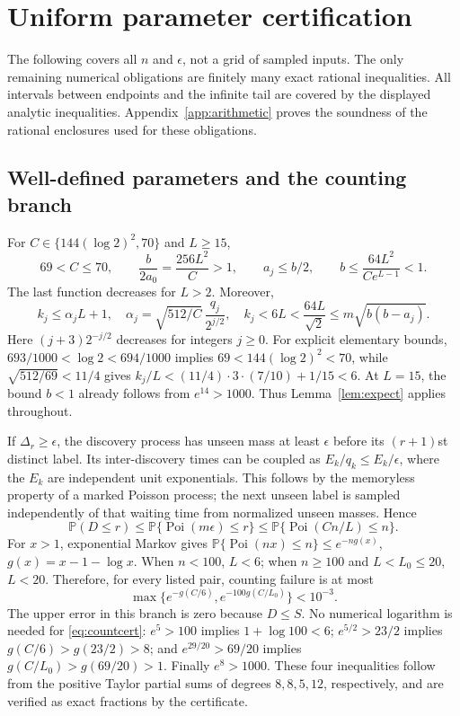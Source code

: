 \documentclass[10pt]{article}
\newcommand{\Prb}{\mathbb P}
\newcommand{\Poi}{\operatorname{Poi}}
\begin{document}
\section{Uniform parameter certification}
The following covers all $n$ and $\epsilon$, not a grid of sampled inputs.
The only remaining numerical obligations are finitely many exact rational
inequalities. All intervals between endpoints and the infinite tail are
covered by the displayed analytic inequalities. Appendix~\ref{app:arithmetic}
proves the soundness of the rational enclosures used for these obligations.

\subsection{Well-defined parameters and the counting branch}
For $C\in\{144(\log2)^2,70\}$ and $L\ge15$,
\[
 69<C\le70,\qquad \frac b{2a_0}=\frac{256L^2}{C}>1,\qquad
 a_j\le b/2,\qquad b\le\frac{64L^2}{Ce^{L-1}}<1.
\]
The last function decreases for $L>2$. Moreover,
\[
 k_j\le\alpha_j L+1,\quad
 \alpha_j=\sqrt{512/C}\,\frac{q_j}{2^{j/2}},\quad
 k_j<6L<\frac{64L}{\sqrt2}\le m\sqrt{b(b-a_j)}.
\]
Here $(j+3)2^{-j/2}$ decreases for integers $j\ge0$.
For explicit elementary bounds, $693/1000<\log2<694/1000$ implies
$69<144(\log2)^2<70$, while
$\sqrt{512/69}<11/4$ gives
$k_j/L<(11/4)\cdot3\cdot(7/10)+1/15<6$.
At $L=15$, the bound $b<1$ already follows from $e^{14}>1000$.
Thus Lemma~\ref{lem:expect} applies throughout.

If $\Delta_r\ge\epsilon$, the discovery process has unseen mass at least
$\epsilon$ before its $(r+1)$st distinct label. Its inter-discovery times
can be coupled as $E_k/q_k\le E_k/\epsilon$, where the $E_k$ are independent
unit exponentials. This follows by the memoryless property of a marked
Poisson process; the next unseen label is sampled independently of that
waiting time from normalized unseen masses. Hence
\[
 \Prb(D\le r)\le\Prb\{\Poi(m\epsilon)\le r\}
 \le\Prb\{\Poi(Cn/L)\le n\}.
\]
For $x>1$, exponential Markov gives
$\Prb\{\Poi(nx)\le n\}\le e^{-ng(x)}$, $g(x)=x-1-\log x$.
When $n<100$, $L<6$; when $n\ge100$ and $L<L_0\le20$, $L<20$.
Therefore, for every listed pair, counting failure is at most
\begin{equation}\label{eq:countcert}
 \max\{e^{-g(C/6)},e^{-100g(C/L_0)}\}<10^{-3}.
\end{equation}
The upper error in this branch is zero because $D\le S$.
No numerical logarithm is needed for \eqref{eq:countcert}:
$e^5>100$ implies $1+\log100<6$;
$e^{5/2}>23/2$ implies $g(C/6)>g(23/2)>8$;
and $e^{29/20}>69/20$ implies $g(C/L_0)>g(69/20)>1$.
Finally $e^8>1000$. These four inequalities follow from the positive Taylor
partial sums of degrees $8,8,5,12$, respectively, and are verified as
exact fractions by the certificate.
\end{document}
